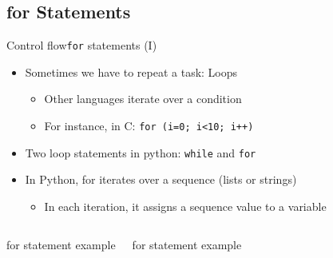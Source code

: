 \documentclass[10pt,compress]{beamer} %
\begin{document}
\subsection{for Statements}
\begin{frame}{Control flow}{\texttt{for} statements (I)}
	\begin{itemize}
		\item Sometimes we have to repeat a task: Loops
			\begin{itemize}
			\item Other languages iterate over a condition
			\item For instance, in C: \texttt{for (i=0; i<10; i++)}
			\end{itemize}
		\item Two loop statements in python: \texttt{while} and \texttt{for}
		\item In Python, for iterates over a sequence (lists or strings)
			\begin{itemize}
			\item In each iteration, it assigns a sequence value to a variable
			\end{itemize}
	\end{itemize}

    \begin{columns}
		\begin{exampleblock}{for statement example}
		
		\end{exampleblock}

		\begin{exampleblock}{for statement example}
		
		\end{exampleblock}
	\end{columns}
\end{frame}
\end{document}
